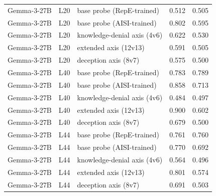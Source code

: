 \begin{table}
\begin{tabular}{lllrr}
Gemma-3-27B & L20 & base probe (RepE-trained) & 0.512 & 0.505 \\
Gemma-3-27B & L20 & base probe (AISI-trained) & 0.802 & 0.595 \\
Gemma-3-27B & L20 & knowledge-denial axis (4v6) & 0.622 & 0.530 \\
Gemma-3-27B & L20 & extended axis (12v13) & 0.591 & 0.505 \\
Gemma-3-27B & L20 & deception axis (8v7) & 0.575 & 0.500 \\
Gemma-3-27B & L40 & base probe (RepE-trained) & 0.783 & 0.789 \\
Gemma-3-27B & L40 & base probe (AISI-trained) & 0.858 & 0.713 \\
Gemma-3-27B & L40 & knowledge-denial axis (4v6) & 0.484 & 0.497 \\
Gemma-3-27B & L40 & extended axis (12v13) & 0.900 & 0.602 \\
Gemma-3-27B & L40 & deception axis (8v7) & 0.679 & 0.500 \\
Gemma-3-27B & L44 & base probe (RepE-trained) & 0.761 & 0.760 \\
Gemma-3-27B & L44 & base probe (AISI-trained) & 0.770 & 0.692 \\
Gemma-3-27B & L44 & knowledge-denial axis (4v6) & 0.564 & 0.496 \\
Gemma-3-27B & L44 & extended axis (12v13) & 0.801 & 0.574 \\
Gemma-3-27B & L44 & deception axis (8v7) & 0.691 & 0.503 \\
\bottomrule
\end{tabular}
\end{table}
